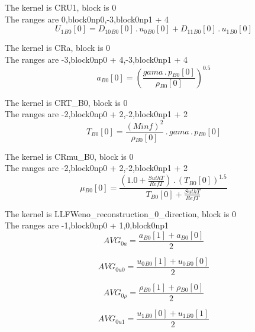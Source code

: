 \documentclass{article}
\begin{document}
\noindent The kernel is CRU1, block is 0\\\noindent The ranges are 0,block0np0,-3,block0np1 + 4\\\begin{dmath}{U_{1}{_{B0}}}[{0}] = {D_{10}{_{B0}}}[{0}] \,.\, {u_{0}{_{B0}}}[{0}] + {D_{11}{_{B0}}}[{0}] \,.\, {u_{1}{_{B0}}}[{0}]\end{dmath}

\noindent The kernel is CRa, block is 0\\\noindent The ranges are -3,block0np0 + 4,-3,block0np1 + 4\\\begin{dmath}{a{_{B0}}}[{0}] = \left(\frac{gama \,.\, {p{_{B0}}}[{0}]}{{\rho{_{B0}}}[{0}]} \right)^{0.5}\end{dmath}

\noindent The kernel is CRT_B0, block is 0\\\noindent The ranges are -2,block0np0 + 2,-2,block0np1 + 2\\\begin{dmath}{T{_{B0}}}[{0}] = \frac{\left(Minf \right)^{2}}{{\rho{_{B0}}}[{0}]} \,.\, gama \,.\, {p{_{B0}}}[{0}]\end{dmath}

\noindent The kernel is CRmu_B0, block is 0\\\noindent The ranges are -2,block0np0 + 2,-2,block0np1 + 2\\\begin{dmath}{\mu{_{B0}}}[{0}] = \frac{\left(1.0 + \frac{SuthT}{RefT}\right) \,.\, \left({T{_{B0}}}[{0}] \right)^{1.5}}{{T{_{B0}}}[{0}] + \frac{SuthT}{RefT}}\end{dmath}

\noindent The kernel is LLFWeno_reconstruction_0_direction, block is 0\\\noindent The ranges are -1,block0np0 + 1,0,block0np1\\\begin{dmath}AVG_{0 a} = \frac{{a{_{B0}}}[{1}] + {a{_{B0}}}[{0}]}{2}\end{dmath}

\begin{dmath}AVG_{0 u0} = \frac{{u_{0}{_{B0}}}[{1}] + {u_{0}{_{B0}}}[{0}]}{2}\end{dmath}

\begin{dmath}AVG_{0 \rho} = \frac{{\rho{_{B0}}}[{1}] + {\rho{_{B0}}}[{0}]}{2}\end{dmath}

\begin{dmath}AVG_{0 u1} = \frac{{u_{1}{_{B0}}}[{0}] + {u_{1}{_{B0}}}[{1}]}{2}\end{dmath}
\end{document}
